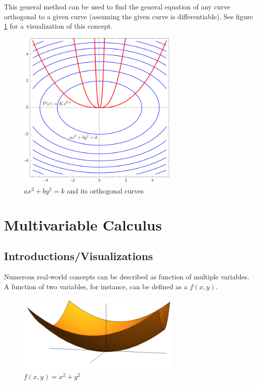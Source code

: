 \documentclass[12pt]{article}
\begin{document}
This general method can be used to find the general equation of any curve orthogonal to a given curve (assuming the given curve is differentiable). See figure \ref{fig:orthogonalcurves} for a visualization of this concept.

\begin{figure}[!ht]
    \centering
    \includegraphics[width=7.8cm]{misc/orthogonalcurves.png}
    \caption{$ax^2+by^2=k$ and its orthogonal curves}
    \label{fig:orthogonalcurves}
\end{figure}

\section{Multivariable Calculus}

\subsection{Introductions/Visualizations}

Numerous real-world concepts can be described as function of multiple variables. A function of two variables, for instance, can be defined as a $f(x,y)$. 

\begin{figure}[!ht]
    \centering
    \includegraphics[width=8cm]{misc/xsquaredysquared.png}
    \caption{$f(x,y)=x^2+y^2$}
    \label{fig:2dfunction}
\end{figure}
\end{document}
